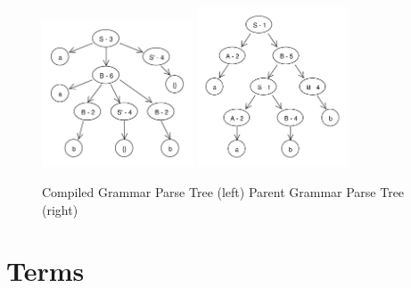 \documentclass[11pt]{article}
\begin{document}
\begin{figure}[h!]
    \centering
    \includegraphics[width=0.4\textwidth,natwidth=458,natheight=444]{umlet/compiled_ex.pdf}
    \includegraphics[width=0.4\textwidth,natwidth=472,natheight=500]{umlet/decompiled_ex.pdf}
    \caption{Compiled Grammar Parse Tree (left) Parent Grammar Parse Tree (right)}
    \label{fig:comp_to_dec_ex}
\end{figure}

\clearpage

\section*{Terms}
\end{document}
